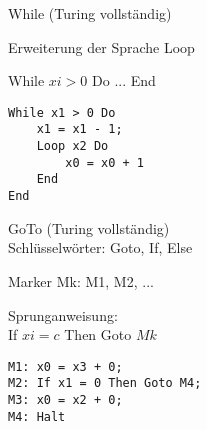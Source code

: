 \begin{minipage}{0.5\linewidth}
    \begin{KR}{While (Turing vollständig)}

        Erweiterung der Sprache Loop

        While $xi > 0$ Do ... End
    \end{KR}
    \begin{example}        
\begin{lstlisting}[style=Pseudocode, aboveskip=-0.5\baselineskip, belowskip=-0.5\baselineskip]
While x1 > 0 Do
    x1 = x1 - 1;
    Loop x2 Do
        x0 = x0 + 1
    End
End
\end{lstlisting}
\end{example}
\end{minipage}
\begin{minipage}{0.5\linewidth}
\begin{KR}{GoTo (Turing vollständig)}\\
        Schlüsselwörter: Goto, If, Else
        
        Marker Mk: M1, M2, ...
        
        Sprunganweisung:\\ If $xi = c$ Then Goto $Mk$ 
\end{KR}
\begin{example}
\begin{lstlisting}[style=Pseudocode, aboveskip=-0.5\baselineskip, belowskip=-0.5\baselineskip]
M1: x0 = x3 + 0;
M2: If x1 = 0 Then Goto M4;
M3: x0 = x2 + 0;
M4: Halt
\end{lstlisting}
\end{example}
\end{minipage}
